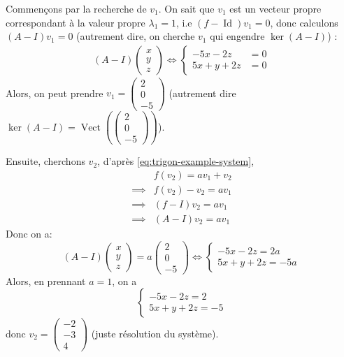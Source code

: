 \begin{eg}
   Commençons par la recherche de $v_1$. On sait que  $v_1$ est un vecteur propre correspondant à la valeur propre  $\lambda_1 = 1$, i.e  $(f - \operatorname{Id})v_1 = 0$, donc calculons $(A - I)v_1 = 0$ (autrement dire, on cherche $v_1$ qui engendre  $\ker(A - I)$) :
   \begin{align*}
       (A - I) \begin{pmatrix} x \\ y \\ z \end{pmatrix} \iff 
       \begin{cases}
           -5x    -2z & = 0\\
            5x  +y +2z &=0
       \end{cases}
    \end{align*}
    Alors, on peut prendre $v_1 = \begin{pmatrix} 2 \\ 0 \\ -5 \end{pmatrix} $ (autrement dire $\ker(A - I) = \operatorname{Vect}(\begin{pmatrix} 2 \\ 0 \\ -5 \end{pmatrix})$).

    Ensuite, cherchons $v_2$, d'après \ref{eq:trigon-example-system}, 
    \begin{align*}
        &f(v_2) = av_1 + v_2 \\
        \implies &f(v_2) - v_2 = av_1\\
        \implies &(f - I)v_2 = a v_1\\
        \implies &(A - I)v_2 = a v_1
    \end{align*}
    Donc on a:
    \[
        (A - I)\begin{pmatrix} x \\ y \\ z \end{pmatrix} = a \begin{pmatrix} 2 \\ 0 \\ -5 \end{pmatrix} \iff
        \begin{cases}
            -5x - 2z = 2a\\
            5x + y + 2z = -5a
        \end{cases}
    \] 
    Alors, en prennant $a = 1$, on a 
    \[
        \begin{cases}
            -5x - 2z = 2\\
            5x + y + 2z = -5
        \end{cases}
    \] 
    donc $v_2 = \begin{pmatrix} -2 \\ -3 \\ 4 \end{pmatrix} $ (juste résolution du système).


\end{eg}
